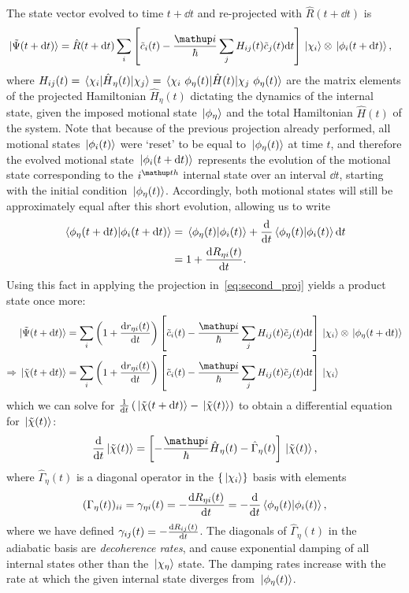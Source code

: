 The state vector evolved to time $t+\dd t$ and re-projected with $\hat R(t + \dd t)$ is
\begin{align}\label{eq:second_proj}
\ket{\tilde \Psi(t + \dd t)} &= 
\hat R(t + \dd t)
\sum_i
\left[\tilde c_i(t) - \frac\ii\hbar\sum_j H_{ij}(t)\tilde c_j(t)\dd t\right]
\ket{\chi_i}\otimes\ket{\phi_i(t + \dd t)},
\end{align}
where $H_{ij}(t) = \matrixel{\chi_i}{\hat H_{\eta}(t)}{\chi_j} = \matrixel{\chi_i\ \phi_\eta(t)}{\hat H(t)}{\chi_j\ \phi_\eta(t)}$ are the matrix elements of the projected Hamiltonian $\hat H_\eta(t)$ dictating the dynamics of the internal state, given the imposed motional state $\ket{\phi_\eta}$ and the total Hamiltonian $\hat H(t)$ of the system. Note that because of the previous projection already performed, all motional states $\ket{\phi_i(t)}$ were `reset' to be equal to $\ket{\phi_\eta(t)}$ at time $t$, and therefore the evolved motional state $\ket{\phi_i(t + \dd t)}$ represents the evolution of the motional state corresponding to the $i^\up{th}$ internal state over an interval $\dd t$, starting with the initial condition $\ket{\phi_\eta(t)}$. Accordingly, both motional states will still be approximately equal after this short evolution, allowing us to write
\begin{align}
\braket{\phi_\eta(t + \dd t)}{\phi_i(t + \dd t)} &= \braket{\phi_\eta(t)}{\phi_i(t)} + \dv{t}\braket{\phi_\eta(t)}{\phi_i(t)}\dd t\\
& = 1 + \dv{R_{\eta i}(t)}{t}.
\end{align}
Using this fact in applying the projection in~\eqref{eq:second_proj} yields a product state once more:
\begin{align}
\ket{\tilde \Psi(t + \dd t)} &= 
\sum_i
\left(1 + \dv{r_{\eta i}(t)}{t}\right)
\left[\tilde c_i(t) - \frac{\ii}\hbar\sum_j H_{ij}(t) \tilde c_j(t)\dd t\right]
\ket{\chi_i}\otimes\ket{\phi_\eta(t + \dd t)}\\
\Rightarrow \ket{\tilde \chi(t + \dd t)} &= \sum_i
\left(1 + \dv{r_{\eta i}(t)}{t}\right)
\left[\tilde c_i(t) - \frac{\ii}\hbar\sum_j H_{ij}(t) \tilde c_j(t)\dd t\right]
\ket{\chi_i}
\end{align}
which we can solve for $\frac1{\dd t}\left(\ket{\tilde \chi(t + \dd t)} - \ket{\tilde \chi(t)}\right)$ to obtain a differential equation for $\ket{\tilde \chi(t)}$:
\begin{align}
\dv{t} \ket{\tilde \chi(t)} =
\left[-\frac\ii\hbar\hat H_\eta(t) - \hat\Gamma_\eta(t)\right]\ket{\tilde\chi(t)},
\end{align}
where $\hat\Gamma_\eta(t)$ is a diagonal operator in the $\{\ket{\chi_i}\}$ basis with elements
\begin{align}
(\Gamma_\eta(t))_{ii} = \gamma_{\eta i}(t) = -\dv{R_{\eta i}(t)}{t} = -\dv{t} \braket{\phi_\eta(t)}{\phi_i(t)},
\end{align}
where we have defined $\gamma_{ij}(t) = -\dv{R_{ij}(t)}{t}$. The diagonals of $\hat \Gamma_\eta(t)$ in the adiabatic basis are \emph{decoherence rates}, and cause exponential damping of all internal states other than the $\ket{\chi_\eta}$ state. The damping rates increase with the rate at which the given internal state diverges from $\ket{\phi_\eta(t)}$.

